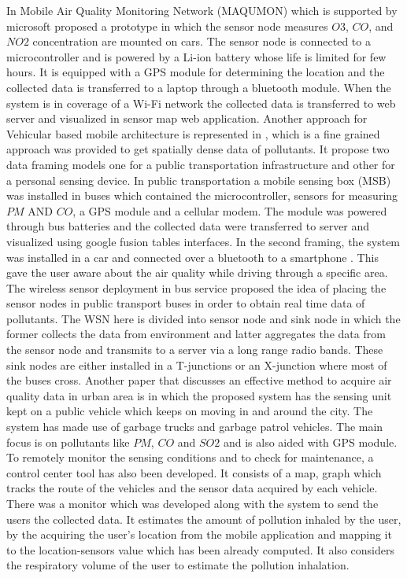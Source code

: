 In Mobile Air Quality Monitoring Network (MAQUMON) \cite{Volgyesi2008} which is supported by microsoft proposed a prototype in which the sensor node  measures $O3$, $CO$, and $NO2$ concentration are mounted on cars. The sensor node is connected to a microcontroller and is powered by a Li-ion battery whose life is limited for few hours. It is equipped with a GPS module for determining the location and the collected data is transferred to a laptop through a bluetooth module. When the system is in coverage of a Wi-Fi network the collected data is transferred to web server and visualized in sensor map web application. Another approach for Vehicular based mobile architecture is represented in \cite{Devarakonda2013}, which is a fine grained approach was provided to get spatially dense data of pollutants. It propose two data framing models one for a public transportation infrastructure and other for a personal sensing device. In public transportation a mobile sensing box (MSB) was installed in buses which contained the microcontroller, sensors for measuring $PM$ AND $ CO$, a GPS module and a cellular modem. The module was powered through bus batteries and the collected data were transferred to server and visualized using google fusion tables interfaces. In the second framing, the system was installed in a car and connected over a bluetooth to a smartphone . This gave the user aware about the air quality while driving through a specific area.
The wireless sensor deployment in bus service \cite{Saha2017} proposed the idea of placing the sensor nodes in public transport buses in order to obtain real time data of pollutants. The WSN here is divided into sensor node and sink node in which the former collects the data from environment and latter aggregates the data from the sensor node and transmits to a server via a long range radio bands. These sink nodes are either installed in a T-junctions or an X-junction where most of the buses cross.
Another paper that  discusses an effective method to acquire air quality data in urban area is \cite {Shirai2016} in which the proposed system has the sensing unit kept on a public vehicle which keeps on moving in and around the city. The system has made use of garbage trucks and garbage patrol vehicles. The main focus is on pollutants like $PM$, $CO$ and $SO2$ and is also aided with GPS module. To remotely monitor the sensing conditions and to check for maintenance, a control center tool has also been developed. It consists of a map, graph which tracks the route of the vehicles and the sensor data acquired by each vehicle. There was a  monitor which was developed along with the system to send the users the collected data. It estimates the amount of pollution inhaled by the user, by the acquiring the user's location from the mobile application and mapping it to the location-sensors value which has been already computed. It also considers the respiratory volume of the user to estimate the pollution inhalation.

